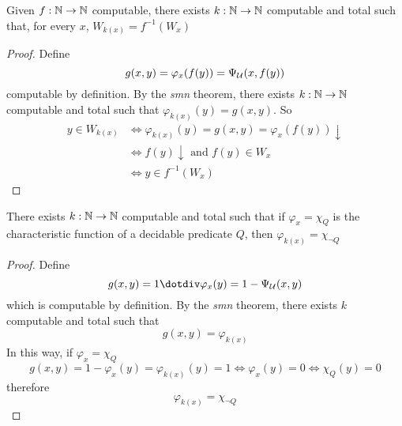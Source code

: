 \begin{proposition}
  Given $f : \mathbb{N} \to \mathbb{N}$ computable, there exists $k : \mathbb{N} \to \mathbb{N}$
computable and total such that, for every $x$, $W_{k(x)} = f^{-1}(W_x)$
\begin{proof}
  Define
  \[g(x,y) = \varphi_x(f(y)) = \Psi_{\mathcal{U}}(x, f(y))\] computable by
  definition. By the \emph{smn} theorem, there exists $k: \mathbb{N} \to \mathbb{N}$ computable
  and total such that \(\varphi_{k(x)}(y) = g(x,y)\). So
  \[
    \begin{split}
      y \in W_{k(x)} & \Leftrightarrow \varphi_{k(x)}(y) = g(x,y) = \varphi_x(f(y)) \downarrow \\
      & \Leftrightarrow f(y)\downarrow \mbox{ and } f(y) \in W_x \\
      & \Leftrightarrow y \in f^{-1}(W_x)
    \end{split}
  \]
\end{proof}
\end{proposition}

\begin{proposition}
There exists $k : \mathbb{N} \to \mathbb{N}$ computable and total such that if
$\varphi_x = \chi_Q$ is the characteristic function of a decidable
predicate $Q$, then $\varphi_{k(x)} = \chi_{\neg Q}$
\begin{proof}
  Define \[g(x,y) = 1 \dotdiv \varphi_x(y) = 1 - \univ(x,y) \]
  which is computable by definition. By the \emph{smn} theorem, there exists
  $k$ computable and total such that \[g(x,y) = \varphi_{k(x)}\]
  In this way,
  if $\varphi_x = \chi_Q$
  \[
    g(x,y) = 1-\varphi_x(y) = \varphi_{k(x)}(y) = 1 \Leftrightarrow
    \varphi_x(y) = 0 \Leftrightarrow \chi_Q(y) = 0
  \]
  therefore
  \[
    \varphi_{k(x)} = \chi_{\neg Q}
  \]
\end{proof}
\end{proposition}
